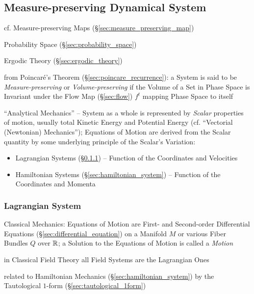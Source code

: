 \subsection{Measure-preserving Dynamical System}
\label{sec:measure_preserving_system}

\fist cf. Measure-preserving Maps (\S\ref{sec:measure_preserving_map})

Probability Space (\S\ref{sec:probability_space})

\fist Ergodic Theory (\S\ref{sec:ergodic_theory})

from Poincar\'e's Theorem (\S\ref{sec:poincare_recurrence}): a System is said to
be \emph{Measure-preserving} or \emph{Volume-preserving} if the Volume of a Set
in Phase Space is Invariant under the Flow Map (\S\ref{sec:flow}) $f^t$ mapping
Phase Space to itself

``Analytical Mechanics'' -- System as a whole is represented by \emph{Scalar}
properties of motion, usually total Kinetic Energy and Potential Energy (cf.
``Vectorial (Newtonian) Mechanics''); Equations of Motion are derived from the
Scalar quantity by some underlying principle of the Scalar's Variation:
\begin{itemize}
  \item Lagrangian Systems (\S\ref{sec:lagrangian_system}) -- Function of the
    Coordinates and Velocities
  \item Hamiltonian Systems (\S\ref{sec:hamiltonian_system}) -- Function of the
    Coordinates and Momenta
\end{itemize}



\subsubsection{Lagrangian System}\label{sec:lagrangian_system}

Classical Mechanics: Equations of Motion are First- and Second-order
Differential Equations (\S\ref{sec:differential_equation}) on a Manifold $M$ or
various Fiber Bundles $Q$ over $\mathbb{R}$; a Solution to the Equations of Motion
is called a \emph{Motion}

in Classical Field Theory all Field Systems are the Lagrangian Ones

related to Hamiltonian Mechanics (\S\ref{sec:hamiltonian_system}) by the
Tautological $1$-form (\S\ref{sec:tautological_1form})

